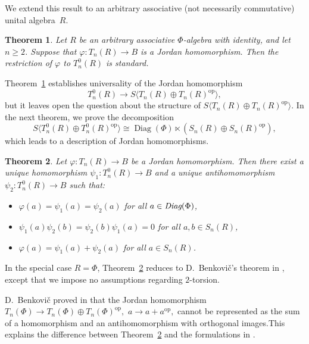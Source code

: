 \documentclass[12pt]{amsart}
\newtheorem{thm}{Theorem}
\begin{document}
{We extend this result to an arbitrary  associative (not necessarily commutative) unital  algebra~\( R \). 

\begin{thm}\label{main_th1}
Let \( R \) be an arbitrary associative  \( \Phi  \)-algebra with identity, and let  $n \geq 2$.   
Suppose that	$\varphi: T_n(R) \to B$ is a Jordan homomorphism. Then the restriction of $\varphi$  to $T_n^0 (R)$  is standard.  \end{thm}
	
	
	
	
	
Theorem~\ref{main_th1} establishes universality of the  Jordan homomorphism 
	\[
	T_n^0(R) \longrightarrow S\langle T_n(R) \oplus T_n(R)^{\text{op}} \rangle,
	\]
	but it leaves open the question about the 	structure of  $S\langle T_n(R) \oplus T_n(R)^{\mathrm{op}} \rangle.$	In the next theorem, we prove the decomposition
	\[
	S\langle T_n^0(R) \oplus T_n^0(R)^{\text{op}} \rangle 
	\cong
	\operatorname{Diag}(\Phi) \ltimes 
	(S_n(R) \oplus S_n(R)^{\text{op}}),
	\]
	which leads to a description of Jordan homomorphisms.
	
	
	
\begin{thm}\label{main_th2} Let ${\varphi: T_n(R) \to B}$  be a Jordan homomorphism. Then there  exist a unique homomorphism $\psi_1: T_n^0(R)  \to B$ and a unique antihomomorphism $\psi_2: T_n^0(R) \to B$ such that:
	\begin{itemize}
		\item[$(i)$] $\varphi(a) = \psi_1(a) = \psi_2(a)$ for all $a \in \emph{\text{Diag}}(\Phi)$,
		\item[$(ii)$] $ \psi_1(a)  \psi_2(b)= \psi_2(b)  \psi_1(a)=0$ for all $a, b \in S_n(R)$,
		\item[$(iii)$] $\varphi(a) =\psi_1(a) + \psi_2(a)$ for all $a \in S_n(R)$.
	\end{itemize} \end{thm}
	

In the special case $R = \Phi$, Theorem~\ref{main_th2}  reduces to D.~Benkovi\v{c}'s theorem in  \cite{Benkovic}, except that we impose no assumptions regarding  $2$-torsion.
	

D.~Benkovi\v{c} proved in \cite{Benkovic} that  the Jordan homomorphism $T_n(\Phi) \to  T_n(\Phi) \oplus T_n(\Phi)^{\text{op}}, $ $a \to a+ a^{\text{op}},$   cannot be represented as the sum of a homomorphism and an antihomomorphism with orthogonal images.This explains the difference between   Theorem~\ref{main_th2}  and the formulations in  \cite{Bresar,Bresar2,Her}.

}
\end{document}
